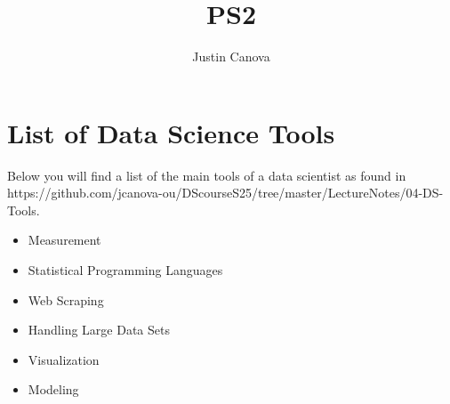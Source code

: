 \documentclass{article}
\title{PS2}
\author{Justin Canova}
\begin{document}
\maketitle



\section{List of Data Science Tools}

Below you will find a list of the main tools of a data scientist as found in https://github.com/jcanova-ou/DScourseS25/tree/master/LectureNotes/04-DS-Tools.


\begin{itemize}
\item Measurement
\item Statistical Programming Languages 
\item Web Scraping
\item Handling Large Data Sets
\item Visualization
\item Modeling
\end{itemize}
\end{document}
